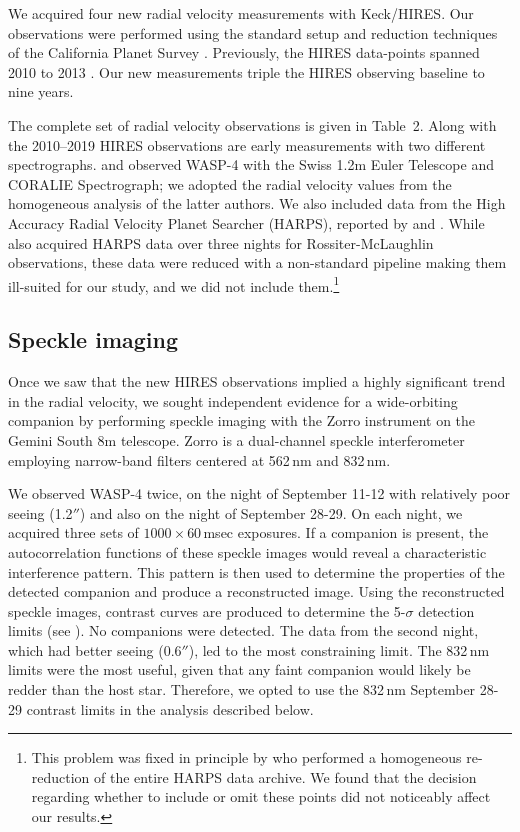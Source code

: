 \documentclass[12pt,twocolumn,tighten]{aastex62}
\begin{document}
We acquired four new radial velocity measurements with Keck/HIRES.
Our observations were performed using the standard setup and reduction
techniques of the California Planet Survey \citep{howard_cps_2010}.
Previously, the HIRES data-points spanned 2010 to 2013
\citep{knutson_friends_2014}.  Our new measurements triple the HIRES
observing baseline to nine years.

The complete set of radial velocity observations is given in Table~2.
Along with the 2010--2019 HIRES observations are early measurements
with two different spectrographs.  \citet{wilson_wasp-4b_2008} and
\citet{triaud_spin-orbit_2010} observed WASP-4 with the Swiss 1.2m
Euler Telescope and CORALIE Spectrograph; we adopted the radial
velocity values from the homogeneous analysis of the latter authors.
We also included data from the High Accuracy Radial Velocity Planet
Searcher (HARPS), reported by \citet{pont_determining_2011} and
\citet{husnoo_observational_2012}.  While
\citet{triaud_spin-orbit_2010} also acquired HARPS data over three
nights for Rossiter-McLaughlin observations, these data were reduced
with a non-standard pipeline making them ill-suited for our study, and
we did not include them.\footnote{This problem was fixed in principle
by \citet{trifonov_public_2020} who performed a homogeneous
re-reduction of the entire HARPS data archive.  We found that the
decision regarding whether to include or omit these points did not
noticeably affect our results.}

\subsection{Speckle imaging}

Once we saw that the new HIRES observations implied a highly
significant trend in the radial velocity, we sought independent
evidence for a wide-orbiting companion by performing speckle imaging
with the Zorro instrument on the Gemini South 8m
telescope\citep[see][and the instrument
web-pages\footnote{\url{www.gemini.edu/sciops/instruments/alopeke-zorro/}}]{scott_nessi_2018}.
Zorro is a dual-channel speckle interferometer employing narrow-band
filters centered at 562$\,$nm and 832$\,$nm.  

We observed WASP-4 twice, on the night of September 11-12 with
relatively poor seeing (1.2$''$) and also on the night of September
28-29.  On each night, we acquired three sets of $1000\times
60$$\,$msec exposures.  If a companion is present, the autocorrelation
functions of these speckle images would reveal a characteristic
interference pattern. This pattern is then used to determine the
properties of the detected companion and produce a reconstructed
image.  Using the reconstructed speckle images, contrast curves are
produced to determine the 5-$\sigma$ detection limits (see
\citealt{howell_speckle_2011}).  No companions were detected. The data
from the second night, which had better seeing (0.6$''$), led to the
most constraining limit.  The 832$\,$nm limits were the most useful,
given that any faint companion would likely be redder than the host
star.  Therefore, we opted to use the 832$\,$nm September 28-29
contrast limits in the analysis described below.
\end{document}
